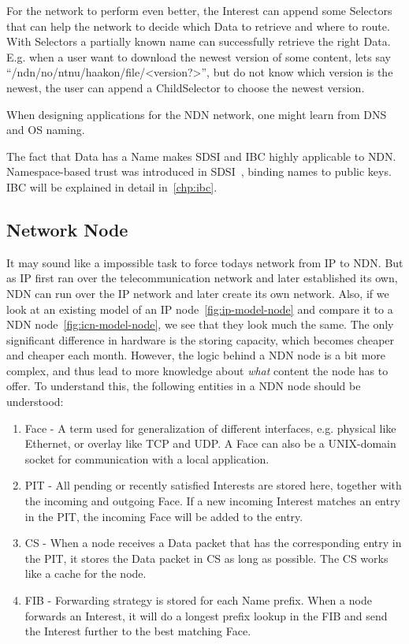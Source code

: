 For the network to perform even better, the Interest can append some Selectors that can help the network to decide which Data to retrieve and where to route.
With Selectors a partially known name can successfully retrieve the right Data.
E.g. when a user want to download the newest version of some content, lets say ``/ndn/no/ntnu/haakon/file/<version?>'', but do not know which version is the newest, the user can append a ChildSelector to choose the newest version.

When designing applications for the \gls{NDN} network, one might learn from \gls{DNS} and \gls{OS} naming.

The fact that Data has a Name makes \gls{SDSI} and \gls{IBC} highly applicable to \gls{NDN}.
Namespace-based trust was introduced in \gls{SDSI}~\cite{rivest1996sdsi}, binding names to public keys.
\gls{IBC} will be explained in detail in~\autoref{chp:ibc}.

\subsection{Network Node}
It may sound like a impossible task to force todays network from \gls{IP} to \gls{NDN}. 
But as \gls{IP} first ran over the telecommunication network and later established its own, \gls{NDN} can run over the \gls{IP} network and later create its own network. 
Also, if we look at an existing model of an \gls{IP} node~\autoref{fig:ip-model-node} and compare it to a \gls{NDN} node~\autoref{fig:icn-model-node}, we see that they look much the same.
The only significant difference in hardware is the storing capacity, which becomes cheaper and cheaper each month.
However, the logic behind a \gls{NDN} node is a bit more complex, and thus lead to more knowledge about \textit{what} content the node has to offer.
To understand this, the following entities in a \gls{NDN} node should be understood:
\begin{enumerate}\label{ndn-node-modules}
  \item Face - A term used for generalization of different interfaces, e.g. physical like Ethernet, or overlay like \gls{TCP} and \gls{UDP}. A Face can also be a UNIX-domain socket for communication with a local application.
  \item \gls{PIT} - All pending or recently satisfied Interests are stored here, together with the incoming and outgoing Face.
  If a new incoming Interest matches an entry in the \gls{PIT}, the incoming Face will be added to the entry. 
  \item \gls{CS} - When a node receives a Data packet that has the corresponding entry in the \gls{PIT}, it stores the Data packet in \gls{CS} as long as possible. 
  The \gls{CS} works like a cache for the node.
  \item \gls{FIB} - Forwarding strategy is stored for each Name prefix. 
  When a node forwards an Interest, it will do a longest prefix lookup in the \gls{FIB} and send the Interest further to the best matching Face.
\end{enumerate}

